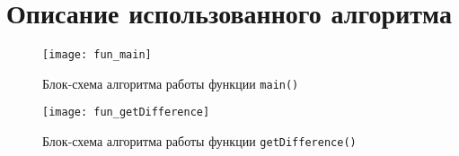 \section{Описание использованного алгоритма}

\begin{figure}[H]
  \centering
  \texttt{[image: fun\_main]}
  \caption{Блок-схема алгоритма работы функции \texttt{main()}}
\end{figure}

\begin{figure}[H]
  \centering
  \texttt{[image: fun\_getDifference]}
  \caption{Блок-схема алгоритма работы функции \texttt{getDifference()}}
\end{figure}
